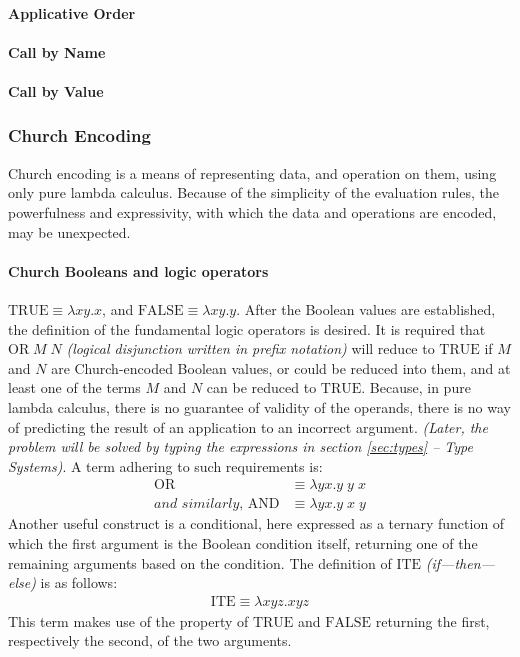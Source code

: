 \documentclass[a4paper,10pt]{article}
\begin{document}
\paragraph{Applicative Order}
\paragraph{Call by Name}
\paragraph{Call by Value}

\subsubsection{Church Encoding}
Church encoding is a means of representing data, and operation on them, using
only pure lambda calculus. Because of the simplicity of the evaluation rules, the powerfulness
and expressivity, with which the data and operations are encoded, may be unexpected.

\paragraph{Church Booleans and logic operators}
$\mathrm{TRUE} \equiv \lambda xy.x$, and $\mathrm{FALSE} \equiv \lambda xy.y$.
After the Boolean values are established, the definition of the fundamental
logic operators is desired. It is required that $\mathrm{OR}\;M\;N$ 
\textit{(logical disjunction written in prefix notation)} will
reduce to $\mathrm{TRUE}$ if $M$ and $N$ are Church-encoded Boolean values,
or could be reduced into them,
and at least one of the terms $M$ and $N$ can be reduced to $\mathrm{TRUE}$.
Because, in pure lambda calculus, there is no guarantee of validity of
the operands, there is no way of predicting the result of an application to
an incorrect argument. \textit{(Later, the problem will be solved by typing
the expressions in section \ref{sec:types} -- Type Systems)}. A term adhering to
such requirements is:
\begin{align*}
	\mathrm{OR} &\equiv \lambda y x. y\;y\;x\\
	\textit{and similarly, }\mathrm{AND} &\equiv \lambda y x. y\;x\;y
\end{align*}
Another useful construct is a conditional, here expressed as a ternary function
of which the first argument is the Boolean condition itself, returning one
of the remaining arguments based on the condition. The definition of
$\mathrm{ITE}$ \textit{(if---then---else)} is as follows:
\begin{align*}
	\mathrm{ITE} \equiv \lambda xyz.xyz
\end{align*}
This term makes use of the property of $\mathrm{TRUE}$ and $\mathrm{FALSE}$
returning the first, respectively the second, of the two arguments.
\end{document}

